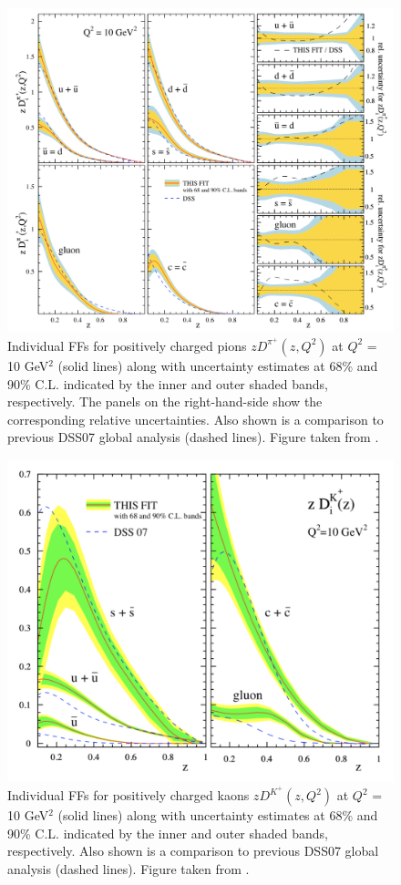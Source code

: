 \begin{figure}[!h]
  \centering
	\includegraphics[scale=0.47]{./gfx/DSEHSPi.png}
	\caption{Individual FFs for positively charged pions $zD^{\pi^+}(z,Q^2)$ at $Q^2$ = 10 GeV$^2$ (solid lines) along with uncertainty estimates at 68\% and 90\% C.L. indicated by the inner and outer shaded bands, respectively. The panels on the right-hand-side show the corresponding relative uncertainties. Also shown is a comparison to previous DSS07 global analysis \cite{DSS07} (dashed lines). Figure taken from \cite{DSEHS1}.}
	\label{pic:DSEHSPi}
\end{figure}

\begin{figure}[!h]
  \centering
	\includegraphics[scale=0.5]{./gfx/DSEHSK.png}
	\caption{Individual FFs for positively charged kaons $zD^{K^+}(z,Q^2)$ at $Q^2$ = 10 GeV$^2$ (solid lines) along with uncertainty estimates at 68\% and 90\% C.L. indicated by the inner and outer shaded bands, respectively. Also shown is a comparison to previous DSS07 global analysis \cite{DSS07} (dashed lines). Figure taken from \cite{DSEHS2}.}
	\label{pic:DSEHSK}
\end{figure}

